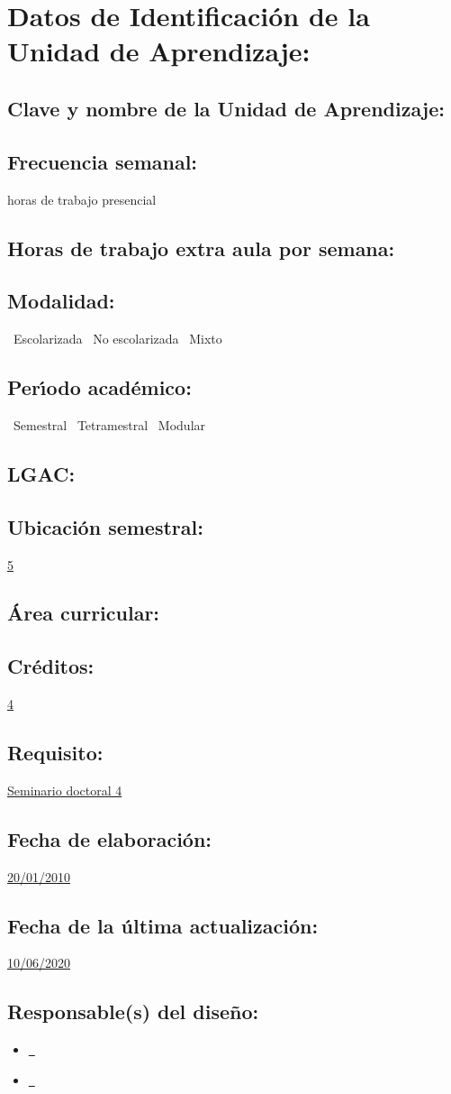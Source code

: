 \documentclass[10 pt]{article}
\begin{document}


\section{Datos de Identificaci\'{o}n de la Unidad de Aprendizaje:}
\subsection{Clave y nombre de la Unidad de Aprendizaje:} 
\subsection{Frecuencia semanal:} horas de trabajo presencial 
\subsection{Horas de trabajo extra aula por semana:} 
\subsection{Modalidad:} \yes~Escolarizada \no~No escolarizada \no~Mixto
\subsection{Per\'{\i}odo acad\'{e}mico:} \yes~Semestral
\no~Tetramestral \no~Modular
\subsection{LGAC:} \underline{\odsi}
\subsection{Ubicaci\'{o}n semestral:} \underline{5}
\subsection{\'{A}rea curricular:} \underline{\fr}
\subsection{Cr\'{e}ditos:} \underline{4}
\subsection{Requisito:} \underline{Seminario doctoral 4}
\subsection{Fecha de elaboraci\'{o}n:} \underline{20/01/2010}
\subsection{Fecha de la \'{u}ltima actualizaci\'{o}n:} \underline{10/06/2020}
\subsection{Responsable(s) del dise\~{n}o:}
\begin{itemize}[label={}]
\item \underline{\ncesar~\cesar}
\item \underline{\nelisa~\elisa}
\end{itemize}
\newpage


\end{document}
